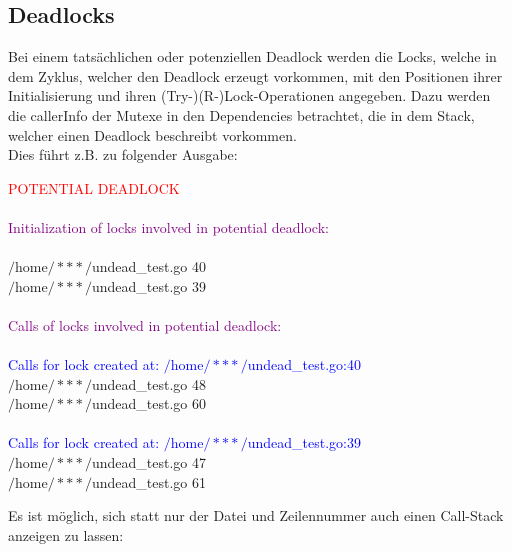 \subsection{Deadlocks}
Bei einem tatsächlichen oder potenziellen Deadlock werden die Locks, welche in 
dem Zyklus, welcher den Deadlock erzeugt vorkommen, mit den Positionen
ihrer Initialisierung und ihren (Try-)(R-)Lock-Operationen angegeben. Dazu 
werden die callerInfo der Mutexe in den 
Dependencies betrachtet, die in dem Stack, welcher einen Deadlock beschreibt 
vorkommen.\\
Dies führt z.B. zu folgender Ausgabe:
\begin{mdframed}
\textcolor{red}{POTENTIAL DEADLOCK}\\
\\
\textcolor{purple}{Initialization of locks involved in potential deadlock:}\\
\\
$/$home$/***/$undead\_test.go 40\\
$/$home$/***/$undead\_test.go 39\\
\\
\textcolor{purple}{Calls of locks involved in potential deadlock:}\\
\\
\textcolor{blue}{Calls for lock created at: $/$home$/***/$undead\_test.go:40}\\
$/$home$/***/$undead\_test.go 48\\
$/$home$/***/$undead\_test.go 60\\
\\
\textcolor{blue}{Calls for lock created at: $/$home$/***/$undead\_test.go:39}\\
$/$home$/***/$undead\_test.go 47\\
$/$home$/***/$undead\_test.go 61
\end{mdframed}
Es ist möglich, sich statt nur der Datei und Zeilennummer auch einen 
Call-Stack anzeigen zu lassen:
